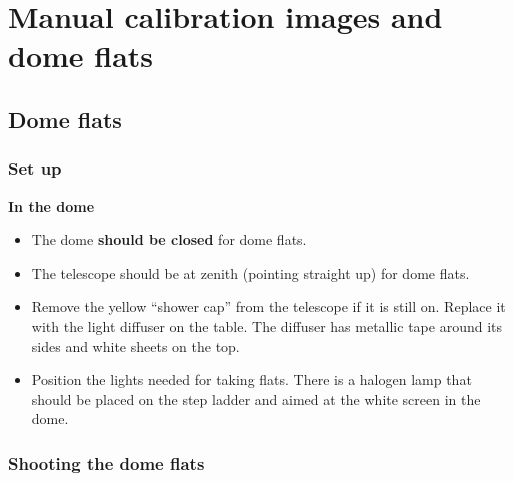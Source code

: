 \documentclass[letterpaper, 12pt]{report}
\newcommand{\location}[1]{\noindent\large{\textbf{#1}}}
\newcommand{\indome}{\location{In the dome}}
\begin{document}
\chapter{Manual calibration images and dome flats}\label{ch:manualcalib}

\section{Dome flats}
\label{sec:dome_flats}

\subsection{Set up}
\indome
\begin{itemize}
	\item The dome \textbf{should be closed} for dome flats.
	\item The telescope should be at zenith (pointing straight up) for dome flats.
	\item Remove the yellow ``shower cap'' from the telescope if it is still on. Replace it with the light diffuser on the table. The diffuser has metallic tape around its sides and white sheets on the top.
	\item Position the lights needed for taking flats. There is a halogen lamp that should be placed on the step ladder and aimed at the white screen in the dome.
\end{itemize}

\subsection{Shooting the dome flats} %
\label{sub:shooting_the_dome_flats}
\end{document}

